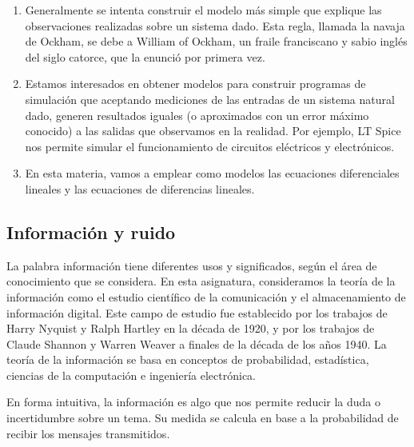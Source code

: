 \begin{enumerate}
\item Generalmente se intenta construir el modelo m\'{a}s simple que
  explique las observaciones realizadas sobre un sistema dado. Esta
  regla, llamada la navaja de Ockham, se debe a William of Ockham, un
  fraile franciscano y sabio ingl\'{e}s del siglo catorce, que 
  la enunció por primera vez.

\item Estamos interesados en obtener modelos para construir programas
  de simulaci\'{o}n que aceptando mediciones de las entradas de un
  sistema natural dado, generen resultados iguales (o aproximados
  con un error m\'{a}ximo conocido) a las salidas que observamos en la realidad.
  Por ejemplo, LT Spice nos permite simular el funcionamiento de circuitos eléctricos
  y electrónicos.
  
\item En esta materia, vamos a emplear como modelos las ecuaciones diferenciales lineales y las ecuaciones de diferencias lineales.
    
\end{enumerate}


\subsection{Informaci\'{o}n y ruido}

La palabra información tiene diferentes usos y significados, según el área de conocimiento que se considera. En esta asignatura, consideramos la teoría de la información como el estudio científico de la comunicación y el almacenamiento de información digital. Este campo de estudio fue establecido por los trabajos de Harry Nyquist y Ralph Hartley en la década de 1920, y por los trabajos de Claude Shannon y Warren Weaver a finales de la década de los años 1940.  La teoría de la información se basa en conceptos de probabilidad, estadística, ciencias de la computación e ingeniería electrónica.

En forma intuitiva, la información es algo que nos permite reducir la duda o incertidumbre sobre un tema. Su medida se calcula en base a la probabilidad de recibir los mensajes transmitidos.


